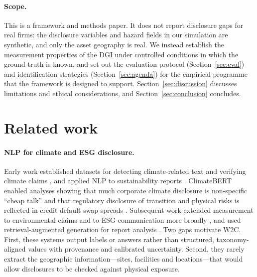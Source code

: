 \documentclass{article}
\theoremstyle{plain}
\theoremstyle{definition}
\begin{document}
\paragraph{Scope.} This is a framework and methods paper. It does not report disclosure gaps for real firms: the disclosure variables and hazard fields in our simulation are synthetic, and only the asset geography is real. We instead establish the measurement properties of the DGI under controlled conditions in which the ground truth is known, and set out the evaluation protocol (Section~\ref{sec:eval}) and identification strategies (Section~\ref{sec:agenda}) for the empirical programme that the framework is designed to support. Section~\ref{sec:discussion} discusses limitations and ethical considerations, and Section~\ref{sec:conclusion} concludes.

\section{Related work}
\label{sec:related}

\paragraph{NLP for climate and ESG disclosure.} Early work established datasets for detecting climate-related text \citep{varini2020climatext} and verifying climate claims \citep{diggelmann2020climatefever}, and applied NLP to sustainability reports \citep{luccioni2020analyzing}. ClimateBERT \citep{webersinke2021climatebert} enabled analyses showing that much corporate climate disclosure is non-specific ``cheap talk'' \citep{bingler2022cheap} and that regulatory disclosure of transition and physical risks is reflected in credit default swap spreads \citep{kolbel2024askbert}. Subsequent work extended measurement to environmental claims \citep{stammbach2023environmental} and to ESG communication more broadly \citep{schimanski2024bridging}, and used retrieval-augmented generation \citep{lewis2020rag} for report analysis \citep{ni2023chatreport,schimanski2024climretrieve}. Two gaps motivate W2C. First, these systems output labels or answers rather than structured, taxonomy-aligned values with provenance and calibrated uncertainty. Second, they rarely extract the geographic information---sites, facilities and locations---that would allow disclosures to be checked against physical exposure.
\end{document}
